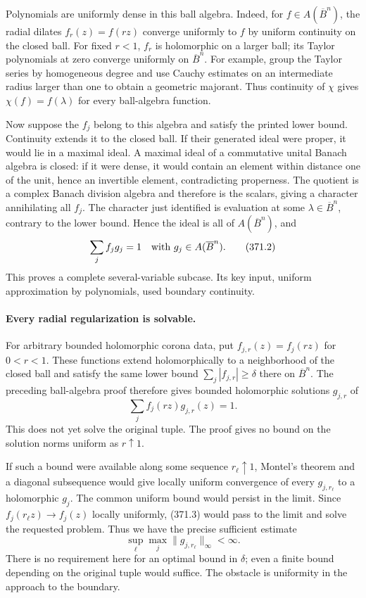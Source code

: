 \documentclass[11pt]{article}
\begin{document}
Polynomials are uniformly dense in this ball algebra. Indeed, for
$f\in A(\overline B^n)$, the radial dilates $f_r(z)=f(rz)$
converge uniformly to $f$ by uniform continuity on the closed ball.
For fixed $r<1$, $f_r$ is holomorphic on a larger ball; its Taylor
polynomials at zero converge uniformly on $\overline B^n$.
For example, group the Taylor series by homogeneous degree and
use Cauchy estimates on an intermediate radius larger than one
to obtain a geometric majorant. Thus continuity of $\chi$ gives
$\chi(f)=f(\lambda)$ for every ball-algebra function.

Now suppose the $f_j$ belong to this algebra and satisfy the
printed lower bound. Continuity extends it to the closed ball.
If their generated ideal were proper, it would lie in a maximal
ideal. A maximal ideal of a commutative unital Banach algebra is
closed: if it were dense, it would contain an element within
distance one of the unit, hence an invertible element, contradicting
properness. The quotient is a complex Banach division algebra
and therefore is the scalars, giving a character annihilating
all $f_j$. The character just identified is evaluation at some
$\lambda\in\overline B^n$, contrary to the lower bound.
Hence the ideal is all of $A(\overline B^n)$, and
\[
 \sum_jf_jg_j=1\quad\hbox{with }g_j\in A(\overline B^n).
 \tag{371.2}
\]
This proves a complete several-variable subcase. Its key input,
uniform approximation by polynomials, used boundary continuity.

\paragraph{Every radial regularization is solvable.}
For arbitrary bounded holomorphic corona data, put
$f_{j,r}(z)=f_j(rz)$ for $0<r<1$. These functions extend
holomorphically to a neighborhood of the closed ball and satisfy
the same lower bound $\sum_j|f_{j,r}|\geq\delta$ there on
$\overline B^n$. The preceding ball-algebra proof therefore gives
bounded holomorphic solutions $g_{j,r}$ of
\[
 \sum_j f_j(rz)g_{j,r}(z)=1.
 \tag{371.3}
\]
This does not yet solve the original tuple. The proof gives no
bound on the solution norms uniform as $r\uparrow1$.

If such a bound were available along some sequence $r_\ell\uparrow1$,
Montel's theorem and a diagonal subsequence would give locally
uniform convergence of every $g_{j,r_\ell}$ to a holomorphic
$g_j$. The common uniform bound would persist in the limit.
Since $f_j(r_\ell z)\to f_j(z)$ locally uniformly, (371.3)
would pass to the limit and solve the requested problem. Thus
we have the precise sufficient estimate
\[
 \sup_\ell\max_j\|g_{j,r_\ell}\|_\infty<\infty.
 \tag{371.4}
\]
There is no requirement here for an optimal bound in $\delta$;
even a finite bound depending on the original tuple would suffice.
The obstacle is uniformity in the approach to the boundary.
\end{document}

